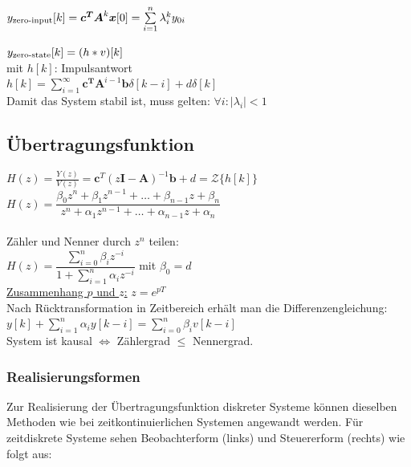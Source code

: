 \documentclass[a4paper,landscape,6pt]{article}
\newcommand{\ma}[1]{\ensuremath{\boldsymbol {#1}}}								%
\renewcommand{\vec}[1]{\ensuremath{\boldsymbol {#1}}}							%
\newcommand{\ul}[1]{\underline{#1}}
\begin{document}
\begin{multicols}{3}
$y_{\textmd{zero-input}}[k] = \ma{c^T} \ma A^k \vec x [0] = \sum\limits_{i=1}^{n} \lambda_i^k y_{0i}$\newline

$y_{\textmd{zero-state}}[k] = (h*v)[k]$\\

mit $h[k]$: Impulsantwort\\
$\boxed{h[k] = \sum\limits_{i=1}^\infty \vec c^{\ma T} \ma A^{i-1} \vec b \delta[k-i] + d\delta[k]}$\\

Damit das System stabil ist, muss gelten: $\forall i : |\lambda_i| < 1$

\subsection*{Übertragungsfunktion}
$H(z) = \frac{Y(z)}{V(z)} = \ma{c}^T (z\ma{I} - \ma{A})^{-1} \ma{b} + d = \mathcal{Z}\{h[k]\}$\\

$\boxed{H(z) = \dfrac{\beta_0 z^n + \beta_1 z^{n-1} + \dots + \beta_{n-1} z + \beta_n}{z^n + \alpha_1 z^{n-1} + \dots + \alpha_{n-1} z + \alpha_n}}$ \\\\

Zähler und Nenner durch $z^n$ teilen:\\

$\boxed{H(z) = \dfrac{\sum_{i=0}^n \beta_i z^{-i}}{1 + \sum_{i=1}^n \alpha_i z^{-i}}}$ \tab mit $\beta_0 = d$\\

\ul{Zusammenhang $p$ und $z$:} $\boxed{z= e^{pT}}$\\

Nach Rücktransformation in Zeitbereich erhält man die Differenzengleichung:\\
$y[k] + \sum\limits_{i=1}^n \alpha_i y[k-i] = \sum\limits_{i=0}^n \beta_i v[k-i]$\\

System ist kausal $\Leftrightarrow$ Zählergrad $\le$ Nennergrad.

\subsubsection*{Realisierungsformen}
Zur Realisierung der Übertragungsfunktion diskreter Systeme können dieselben Methoden wie bei zeitkontinuierlichen Systemen angewandt werden. Für zeitdiskrete Systeme sehen Beobachterform (links) und Steuererform (rechts) wie folgt aus:


\end{multicols}
\end{document}
